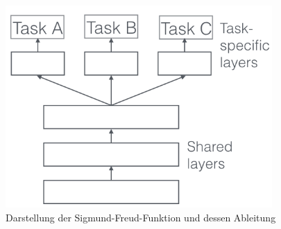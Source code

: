   \begin{figure}[h!]
 	\centering
 	\includegraphics[width=0.8\linewidth]{images/hard}
 	\caption{Darstellung der Sigmund-Freud-Funktion und dessen Ableitung \cite{Kulbear.2017}} %
 	\label{fig:hard}
 \end{figure}

